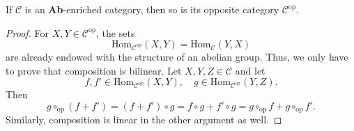 \begin{proposition}
  If $ \mathcal{C} $ is an \textbf{Ab}-enriched category, then so is its opposite category $ \mathcal{C}^{\text{op}} $.
\end{proposition}
\begin{proof}
  For $ X,Y \in \mathcal{C}^{\text{op}} $, the sets
  \begin{equation*}
    \text{Hom}_{\mathcal{C}^{\text{op}}}(X,Y) = \text{Hom}_{\mathcal{C}}(Y,X)
  \end{equation*}
  are already endowed with the structure of an abelian group. Thus, we only have to prove that composition is bilinear. Let $ X,Y,Z \in \mathcal{C} $ and let
  \begin{equation*}
    f,f' \in \text{Hom}_{\mathcal{C}^{\text{op}}}(X,Y),\quad g\in\text{Hom}_{\mathcal{C}^{\text{op}}}(Y,Z).
  \end{equation*}
  Then
  \begin{equation*}
    g\circ_{\text{op}}(f+f')= (f+f')\circ g = f\circ g + f'\circ g = g\circ_{\text{op}} f + g\circ_{\text{op}}f'.
  \end{equation*}
  Similarly, composition is linear in the other argument as well.
\end{proof}

